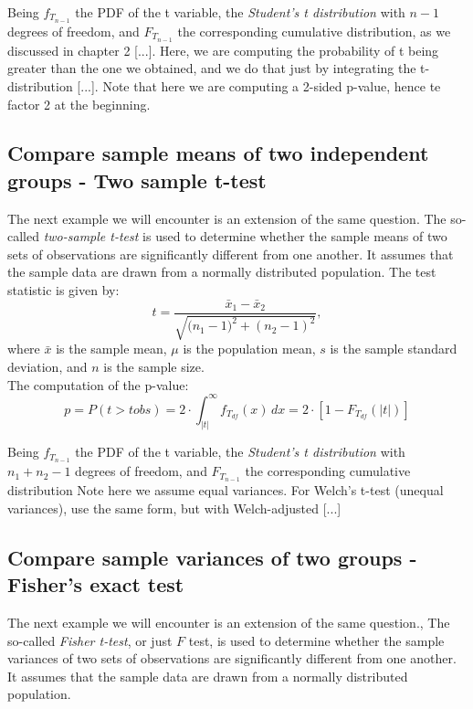 \documentclass{book}
\begin{document}
Being $f_{T_{n-1}}$ the PDF of the t variable, the \textit{Student's t distribution} with $n - 1$ degrees of freedom, and $F_{T_{n-1}}$ the corresponding cumulative distribution, as we discussed in chapter 2 [...]. Here, we are computing the probability of t being greater than the one we obtained, and we do that just by integrating the t-distribution [...]. Note that here we are computing a 2-sided p-value, hence te factor 2 at the beginning. 

\newpage

\subsection{Compare sample means of two independent groups - Two sample t-test}

The next example we will encounter is an extension of the same question. The so-called \textit{two-sample t-test} is used to determine whether the sample means of two sets of observations are significantly different from one another. It assumes that the sample data are drawn from a normally distributed population. The test statistic is given by:
\[
    t = \frac{\bar{x}_{1} - \bar{x}_{2}}{\sqrt{\big(n_{1} - 1)^{2} + (n_{2} - 1)^{2}}},
\]
where $\bar{x}$ is the sample mean, $\mu$ is the population mean, $s$ is the sample standard deviation, and $n$ is the sample size.\\

The computation of the p-value:
\[
p = P\left(t > t obs \right) = 2 \cdot \int_{|t|}^{\infty} f_{T_{df}}(x)\,dx = 2 \cdot \left[1 - F_{T_{df}}(|t|)\right]
\]

Being $f_{T_{n-1}}$ the PDF of the t variable, the \textit{Student's t distribution} with $n_1 + n_2 - 1$ degrees of freedom, and $F_{T_{n-1}}$ the corresponding cumulative distribution
Note here we assume equal variances. For Welch’s t-test (unequal variances), use the same form, but with Welch-adjusted [...]

\newpage

\subsection{Compare sample variances of two groups - Fisher's exact test}

The next example we will encounter is an extension of the same question., The so-called \textit{Fisher t-test}, or just $F$ test, is used to determine whether the sample variances of two sets of observations are significantly different from one another. It assumes that the sample data are drawn from a normally distributed population.\\
\end{document}
